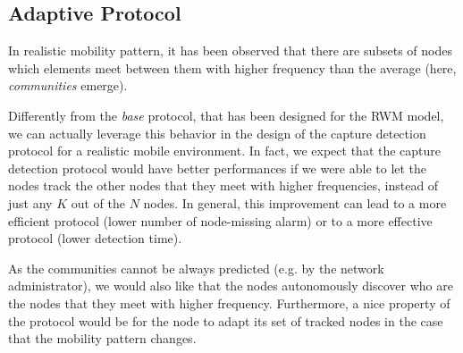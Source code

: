 \documentclass{IEEEconf}
\begin{document}
\subsection{Adaptive Protocol}
\label{adaptiveProtocol}

In
realistic mobility pattern, it has been observed \cite{CDGMM:WWIC:TheQuest} that there are subsets of nodes which elements meet between them with higher frequency than the average (here,
\textit{communities} emerge).

Differently from the \textit{base} protocol, that has been designed for the RWM model, we can actually leverage this behavior in the design of the capture detection protocol for a realistic mobile environment.
In fact, we expect that the capture detection protocol would have better performances if we were able to let the nodes track the other nodes that they meet with higher frequencies, instead of just any $K$ out of the $N$ nodes.
In general, this improvement can lead to a more efficient protocol (lower number of node-missing alarm) or to a more effective protocol (lower detection time).

As the communities cannot be always predicted (e.g. by the network administrator), we would also like that the nodes autonomously discover who are the nodes that they meet with higher frequency.
Furthermore, a nice property of the protocol would be for the node to adapt its set of tracked nodes in the case that the mobility pattern changes.
\end{document}

